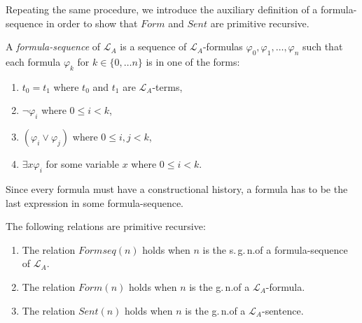 Repeating the same procedure, we introduce the auxiliary definition of a formula-sequence in order to show that $ \mathit{Form}$ and $\mathit{Sent}$ are primitive recursive.

\begin{dfn}
A \textit{formula-sequence} of $\mathcal{L}_A$ is a sequence of $\mathcal{L}_A$-formulas $\varphi_0, \varphi_1, \ldots , \varphi_n $ such that each formula $\varphi_k$ for $k \in \lbrace 0, \ldots n \rbrace $ is in one of the forms:
\begin{enumerate}
\item $t_0 = t_1$ where $t_0$ and $t_1$ are $\mathcal{L}_A$-terms,
\item $\lnot \varphi_i$ where $0 \le i < k$,
\item $(\varphi_i \vee \varphi_j)$ where $0 \le i,j < k$,
\item $\exists x  \varphi_i$ for some variable $x$ where $0 \le i < k$.
\end{enumerate}
\end{dfn}
Since every formula must have a constructional history, a formula has to be the last expression in some formula-sequence.

\begin{lem}
The following relations are primitive recursive:
\begin{enumerate}
\item The relation $\mathit{Formseq}(n)$ holds when $n$ is the s.\,g.\,n.\@ of a formula-sequence of $\mathcal{L}_A$.
\item The relation $\mathit{Form}(n)$ holds when $n$ is the g.\,n.\@ of a $\mathcal{L}_A$-formula.
\item The relation $\mathit{Sent}(n)$ holds when $n$ is the g.\,n.\@ of a $\mathcal{L}_A$-sentence.
\end{enumerate}
\end{lem}

